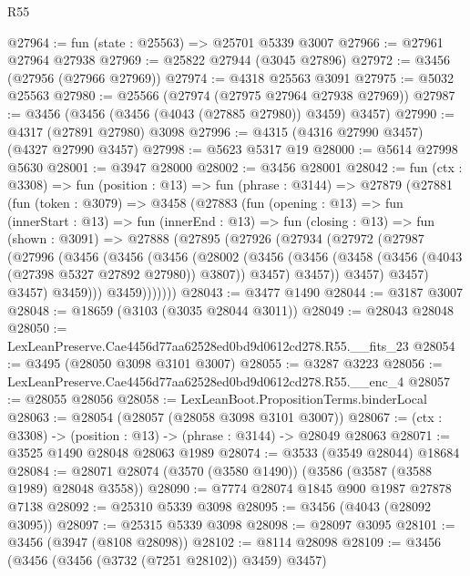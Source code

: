\begin{lexlean}{R55}
\begin{coremodule}
@27964 := fun (state : @25563) => @25701 @5339 @3007
@27966 := @27961 @27964 @27938
@27969 := @25822 @27944 (@3045 @27896)
@27972 := @3456 (@27956 (@27966 @27969))
@27974 := @4318 @25563 @3091
@27975 := @5032 @25563
@27980 := @25566 (@27974 (@27975 @27964 @27938 @27969))
@27987 := @3456 (@3456 (@3456 (@4043 (@27885 @27980)) @3459) @3457)
@27990 := @4317 (@27891 @27980) @3098
@27996 := @4315 (@4316 @27990 @3457) (@4327 @27990 @3457)
@27998 := @5623 @5317 @19
@28000 := @5614 @27998 @5630
@28001 := @3947 @28000
@28002 := @3456 @28001
@28042 := fun (ctx : @3308) =>
  fun (position : @13) =>
  fun (phrase : @3144) =>
  @27879
    (@27881
      (fun (token : @3079) =>
      @3458
        (@27883
          (fun (opening : @13) =>
          fun (innerStart : @13) =>
          fun (innerEnd : @13) =>
          fun (closing : @13) =>
          fun (shown : @3091) =>
          @27888
            (@27895
              (@27926
                (@27934
                  (@27972
                    (@27987
                      (@27996
                        (@3456
                          (@3456
                            (@3456
                              (@28002
                                (@3456
                                  (@3456
                                    (@3458 (@3456 (@4043 (@27398 @5327 @27892 @27980)) @3807))
                                    @3457)
                                  @3457))
                              @3457)
                            @3457)
                          @3457)
                        @3459)))
                  @3459)))))))
@28043 := @3477 @1490
@28044 := @3187 @3007
@28048 := @18659 (@3103 (@3035 @28044 @3011))
@28049 := @28043 @28048
@28050 := LexLeanPreserve.Cae4456d77aa62528ed0bd9d0612cd278.R55.__fits_23
@28054 := @3495 (@28050 @3098 @3101 @3007)
@28055 := @3287 @3223
@28056 := LexLeanPreserve.Cae4456d77aa62528ed0bd9d0612cd278.R55.__enc_4
@28057 := @28055 @28056
@28058 := LexLeanBoot.PropositionTerms.binderLocal
@28063 := @28054 (@28057 (@28058 @3098 @3101 @3007))
@28067 := (ctx : @3308) -> (position : @13) -> (phrase : @3144) -> @28049 @28063
@28071 := @3525 @1490 @28048 @28063 @1989
@28074 := @3533 (@3549 @28044) @18684
@28084 := @28071 @28074 (@3570 (@3580 @1490)) (@3586 (@3587 (@3588 @1989) @28048 @3558))
@28090 := @7774 @28074 @1845 @900 @1987 @27878 @7138
@28092 := @25310 @5339 @3098
@28095 := @3456 (@4043 (@28092 @3095))
@28097 := @25315 @5339 @3098
@28098 := @28097 @3095
@28101 := @3456 (@3947 (@8108 @28098))
@28102 := @8114 @28098
@28109 := @3456 (@3456 (@3456 (@3732 (@7251 @28102)) @3459) @3457)

\end{coremodule}
\end{lexlean}
